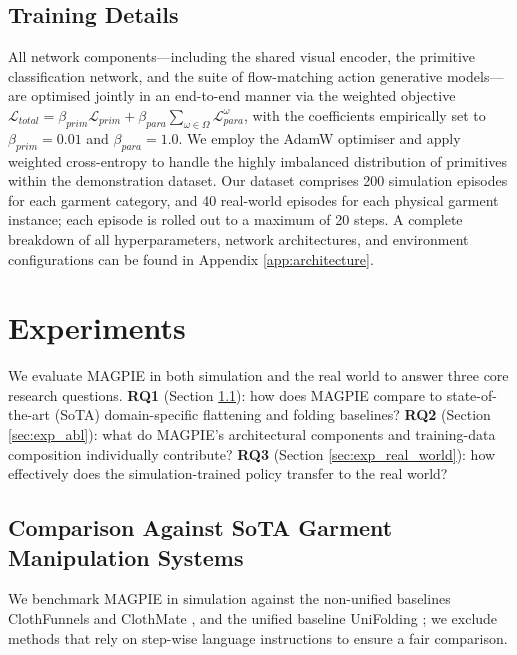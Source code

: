 \documentclass[journal]{IEEEtran}
\begin{document}
\subsection{Training Details}
All network components—including the shared visual encoder, the primitive classification network, and the suite of flow-matching action generative models—are optimised jointly in an end-to-end manner via the weighted objective $\mathcal{L}_{total} = \beta_{prim} \mathcal{L}_{prim} + \beta_{para} \sum_{\omega \in \Omega} \mathcal{L}_{para}^{\omega}$, with the coefficients empirically set to $\beta_{prim} = 0.01$ and $\beta_{para} = 1.0$. We employ the AdamW optimiser and apply weighted cross-entropy to handle the highly imbalanced distribution of primitives within the demonstration dataset. Our dataset comprises 200 simulation episodes for each garment category, and 40 real-world episodes for each physical garment instance; each episode is rolled out to a maximum of 20 steps. A complete breakdown of all hyperparameters, network architectures, and environment configurations can be found in Appendix \ref{app:architecture}.



\section{Experiments}
\label{sec:experiments}

We evaluate MAGPIE in both simulation and the real world to answer three core research questions. \textbf{RQ1} (Section \ref{sec:exp_sota}): how does MAGPIE compare to state-of-the-art (SoTA) domain-specific flattening and folding baselines? \textbf{RQ2} (Section \ref{sec:exp_abl}): what do MAGPIE's architectural components and training-data composition individually contribute? \textbf{RQ3} (Section \ref{sec:exp_real_world}): how effectively does the simulation-trained policy transfer to the real world?

\subsection{Comparison Against SoTA Garment Manipulation Systems}
\label{sec:exp_sota}

We benchmark MAGPIE in simulation against the non-unified baselines ClothFunnels \cite{canberk2022cloth} and ClothMate \cite{luo2025clothmate}, and the unified baseline UniFolding \cite{xue2023unifolding}; we exclude methods that rely on step-wise language instructions to ensure a fair comparison.
\end{document}
